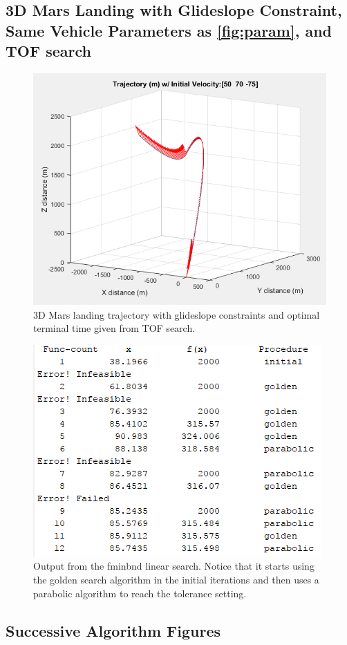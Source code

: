 \documentclass[journal]{new-aiaa}
\begin{document}
\begin{singlespace}
\subsection{3D Mars Landing with Glideslope Constraint, Same Vehicle Parameters as \ref{fig:param}, and TOF search}
\begin{figure}[!htb] 
\centering
\includegraphics[width=.8\textwidth]{3Dtraj.PNG}
\caption{3D Mars landing trajectory with glideslope constraints and optimal terminal time given from TOF search.}
\label{fig:optimn}
\end{figure}
\begin{figure}[!htb] 
\centering
\includegraphics[width=.6\textwidth]{optimn.PNG}
\caption{Output from the fminbnd linear search. Notice that it starts using the golden search algorithm in the initial iterations and then uses a parabolic algorithm to reach the tolerance setting.}
\label{fig:optimn}
\end{figure}

\subsection{Successive Algorithm Figures}


\end{singlespace}
\end{document}
